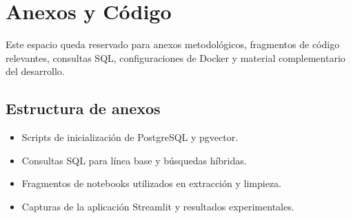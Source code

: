 \appendix
\newpage
\chapter{Anexos y Código}

Este espacio queda reservado para anexos metodológicos, fragmentos de código relevantes, consultas SQL, configuraciones de Docker y material complementario del desarrollo.

\section{Estructura de anexos}

\begin{itemize}
    \item Scripts de inicialización de PostgreSQL y pgvector.
    \item Consultas SQL para línea base y búsquedas híbridas.
    \item Fragmentos de notebooks utilizados en extracción y limpieza.
    \item Capturas de la aplicación Streamlit y resultados experimentales.
\end{itemize}
